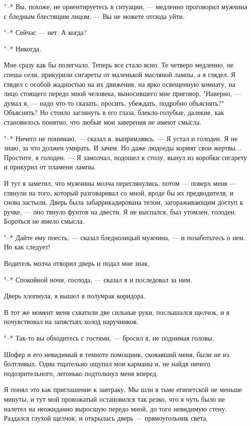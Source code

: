 "--* Вы, похоже, не  ориентируетесь  в  ситуации,  ---  медленно  проговорил
мужчина с бледным блестящим лицом. --- Вы не можете отсюда уйти.

"--* Сейчас --- нет. А когда?

"--* Никогда.

Мне сразу как бы полегчало. Теперь все стало ясно. Те четверо медленно,
не спеша сели, прикурили сигареты от маленькой масляной лампы, а я глядел.
Я глядел с особой жадностью на их движения, на ярко освещенную комнату, на
лицо стоящего передо мной человека, выносившего мне приговор. "Наверно,  ---
думал я, --- надо что-то сказать, просить,  убеждать,  подробно  объяснять?"
Объяснять? Но стоило заглянуть в его глаза, блекло-голубые,  далекие,  как
становилось понятно, что любые мои заверения не имеют смысла.

"--* Ничего не понимаю, --- сказал я, выпрямляясь. --- Я устал и голоден. Я не
знаю, за что  должен  умирать.  И  зачем.  Но  даже  людоеды  кормят  свои
жертвы... Простите, я голоден. --- Я замолчал, подошел  к  столу,  вынул  из
коробки сигарету и прикурил от пламени лампы.

И тут я заметил, что мужчины молча переглянулись, потом --- поверх меня ---
глянули на того, который разговаривал со мной, вроде бы их предводителя, и
снова застыли. Дверь была забаррикадирована телом, загораживающим доступ к
ручке, --- оно тянуло фунтов на двести. Я не выспался, был утомлен, голоден.
Бороться не имело смысла.

"--* Дайте ему поесть, --- сказал бледнолицый мужчина, ---  и  позаботьтесь  о
нем. Но как следует!

Водитель молча отворил дверь и подал мне знак.

"--* Спокойной ночи, господа, --- сказал я и последовал за ним.

Дверь хлопнула, я вышел в полумрак коридора.

В тот же момент меня схватили две сильные руки, послышался щелчок, и  я
почувствовал на запястьях холод наручников.

"--* Так-то вы обходитесь с гостями, --- бросил я, не поднимая головы.

Шофер и его невидимый в темноте помощник, сковавший меня,  были  не  из
болтливых.  Один  тщательно  ощупал  мои  карманы  и,  не   найдя   ничего
подозрительного, легонько подтолкнул меня вперед.

Я понял это как приглашение к завтраку. Мы шли  в  тьме  египетской  не
меньше минуты, и тут мой провожатый остановился так резко, что я чуть было
не налетел на неожиданно выросшую передо мной, до  того  невидимую  стену.
Раздался глухой щелчок, и открылась дверь --- прямоугольник света.

